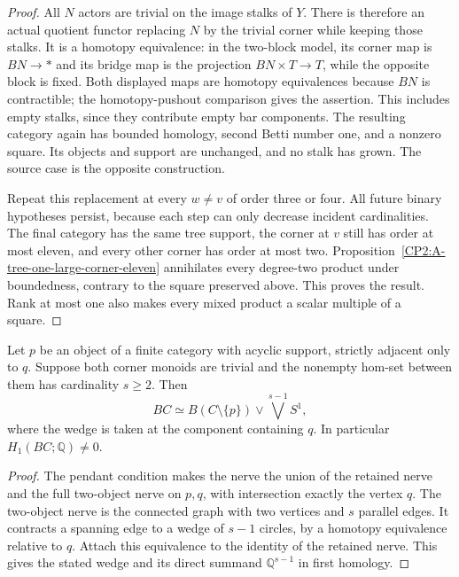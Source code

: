 \begin{proof}
All $N$ actors are trivial on the image stalks of $Y$.
There is therefore an actual quotient functor replacing
$N$ by the trivial corner while keeping those stalks.
It is a homotopy equivalence: in the two-block model,
its corner map is $BN\to *$ and its bridge map is the
projection $BN\times T\to T$, while the opposite block
is fixed. Both displayed maps are homotopy equivalences
because $BN$ is contractible; the homotopy-pushout
comparison gives the assertion. This includes empty
stalks, since they contribute empty bar components.
The resulting category again has bounded homology,
second Betti number one, and a nonzero square. Its
objects and support are unchanged, and no stalk has
grown. The source case is the opposite construction.

Repeat this replacement at every $w\ne v$ of order
three or four. All future binary hypotheses persist,
because each step can only decrease incident cardinalities.
The final category has the same tree support, the corner
at $v$ still has order at most eleven, and every other
corner has order at most two. Proposition~\ref{CP2:A-tree-one-large-corner-eleven}
annihilates every degree-two product under boundedness,
contrary to the square preserved above. This proves
the result. Rank at most one also makes every mixed
product a scalar multiple of a square.
\end{proof}

\begin{lemma}
\label{CP2:A-trivial-pendant-parallel-circle}
Let $p$ be an object of a finite category with acyclic
support, strictly adjacent only to $q$. Suppose both
corner monoids are trivial and the nonempty hom-set
between them has cardinality $s\geq2$. Then
\[
 BC\simeq B(C\setminus\{p\})\vee
                 \bigvee^{s-1}S^1,
\]
where the wedge is taken at the component containing
$q$. In particular $H_1(BC;\mathbb Q)\ne0$.
\end{lemma}
\begin{proof}
The pendant condition makes the nerve the union of
the retained nerve and the full two-object nerve on
$p,q$, with intersection exactly the vertex $q$.
The two-object nerve is the connected graph with two
vertices and $s$ parallel edges. It contracts a spanning
edge to a wedge of $s-1$ circles, by a homotopy equivalence
relative to $q$. Attach this equivalence to the identity
of the retained nerve. This gives the stated wedge and
its direct summand $\mathbb Q^{s-1}$ in first homology.
\end{proof}
